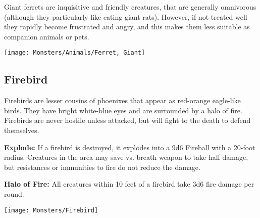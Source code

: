 \begin{multicols*}{2}
Giant ferrets are inquisitive and friendly creatures, that are generally omnivorous (although they particularly like eating giant rats). However, if not treated well they rapidly become frustrated and angry, and this makes them less suitable as companion animals or pets.

\texttt{[image: Monsters/Animals/Ferret, Giant]}

\subsection{Firebird}

Firebirds are lesser cousins of phoenixes that appear as red-orange eagle-like birds. They have bright white-blue eyes and are surrounded by a halo of fire. Firebirds are never hostile unless attacked, but will fight to the death to defend themselves.

\textbf{Explode:} If a firebird is destroyed, it explodes into a 9d6 Fireball with a 20-foot radius. Creatures in the area may save vs. breath weapon to take half damage, but resistances or immunities to fire do not reduce the damage.

\textbf{Halo of Fire:} All creatures within 10 feet of a firebird take 3d6 fire damage per round.

\texttt{[image: Monsters/Firebird]}


\end{multicols*}
